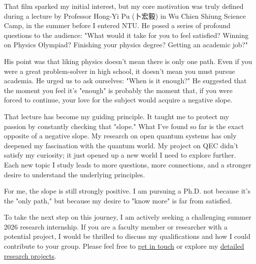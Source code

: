 \documentclass[11pt,a4paper]{article}
\begin{document}
That film sparked my initial interest, but my core motivation was truly defined during a lecture by Professor Hong-Yi Pu (卜宏毅) in Wu Chien Shiung Science Camp, in the summer before I entered NTU. He posed a series of profound questions to the audience: "What would it take for you to feel satisfied? Winning on Physics Olympiad? Finishing your physics degree? Getting an academic job?"

His point was that liking physics doesn't mean there is only one path. Even if you were a great problem-solver in high school, it doesn't mean you must pursue academia. He urged us to ask ourselves: "When is it enough?" He suggested that the moment you feel it's "enough" is probably the moment that, if you were forced to continue, your love for the subject would acquire a negative slope.

That lecture has become my guiding principle. It taught me to protect my passion by constantly checking that "slope." What I've found so far is the exact opposite of a negative slope. My research on open quantum systems has only deepened my fascination with the quantum world. My project on QEC didn't satisfy my curiosity; it just opened up a new world I need to explore further. Each new topic I study leads to more questions, more connections, and a stronger desire to understand the underlying principles.

For me, the slope is still strongly positive. I am pursuing a Ph.D. not because it's the "only path," but because my desire to "know more" is far from satisfied.

To take the next step on this journey, I am actively seeking a challenging summer 2026 research internship. If you are a faculty member or researcher with a potential project, I would be thrilled to discuss my qualifications and how I could contribute to your group. Please feel free to \href{mailto:b12202069@ntu.edu.tw}{get in touch} or explore my \href{https://weihsuanchung.github.io/research.html}{detailed research projects}.
\end{document}
